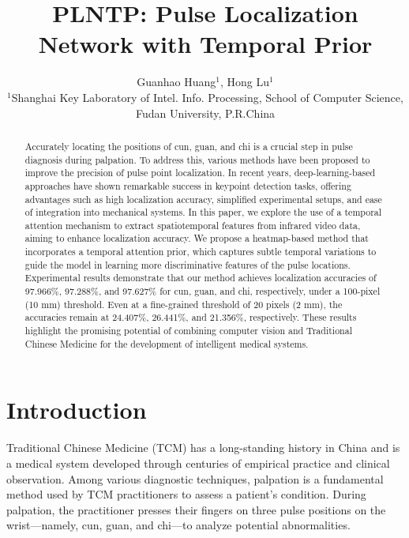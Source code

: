 \documentclass[twocolumn]{article}
\title{PLNTP: Pulse Localization Network with Temporal Prior}
\begin{document}
\author{%
  Guanhao Huang$^{1}$, Hong Lu$^{1}$\\[0.5ex]
  {\small $^{1}$Shanghai Key Laboratory of Intel. Info. Processing,
    School of Computer Science,}\\
  {\small Fudan University, P.R.China}%
}
\date{}
\maketitle

\begin{abstract}
Accurately locating the positions of cun, guan, and chi is a crucial step in pulse diagnosis during palpation. To address this, various methods have been proposed to improve the precision of pulse point localization. In recent years, deep-learning-based approaches have shown remarkable success in keypoint detection tasks, offering advantages such as high localization accuracy, simplified experimental setups, and ease of integration into mechanical systems. In this paper, we explore the use of a temporal attention mechanism to extract spatiotemporal features from infrared video data, aiming to enhance localization accuracy. We propose a heatmap-based method that incorporates a temporal attention prior, which captures subtle temporal variations to guide the model in learning more discriminative features of the pulse locations. Experimental results demonstrate that our method achieves localization accuracies of 97.966\%, 97.288\%, and 97.627\% for cun, guan, and chi, respectively, under a 100-pixel (10 mm) threshold. Even at a fine-grained threshold of 20 pixels (2 mm), the accuracies remain at 24.407\%, 26.441\%, and 21.356\%, respectively. These results highlight the promising potential of combining computer vision and Traditional Chinese Medicine for the development of intelligent medical systems.
\end{abstract}

\section{Introduction}
Traditional Chinese Medicine (TCM) has a long-standing history in China and is a medical system developed through centuries of empirical practice and clinical observation. Among various diagnostic techniques, palpation is a fundamental method used by TCM practitioners to assess a patient’s condition. During palpation, the practitioner presses their fingers on three pulse positions on the wrist—namely, cun, guan, and chi—to analyze potential abnormalities.
\end{document}
